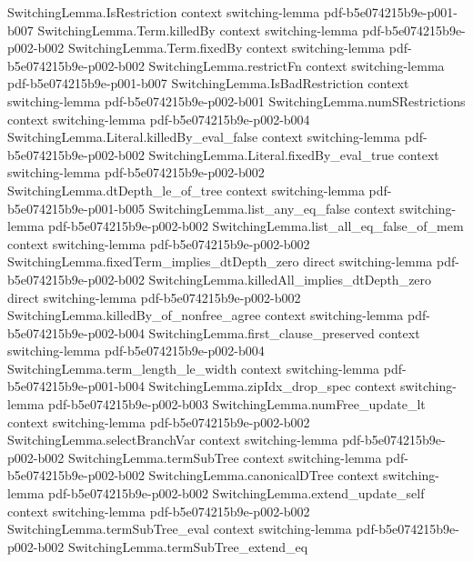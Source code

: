 \begin{lemma}
\proofstep
  {SwitchingLemma.IsRestriction}
  {context}
  {switching-lemma}
  {pdf-b5e074215b9e-p001-b007}
\proofstep
  {SwitchingLemma.Term.killedBy}
  {context}
  {switching-lemma}
  {pdf-b5e074215b9e-p002-b002}
\proofstep
  {SwitchingLemma.Term.fixedBy}
  {context}
  {switching-lemma}
  {pdf-b5e074215b9e-p002-b002}
\proofstep
  {SwitchingLemma.restrictFn}
  {context}
  {switching-lemma}
  {pdf-b5e074215b9e-p001-b007}
\proofstep
  {SwitchingLemma.IsBadRestriction}
  {context}
  {switching-lemma}
  {pdf-b5e074215b9e-p002-b001}
\proofstep
  {SwitchingLemma.numSRestrictions}
  {context}
  {switching-lemma}
  {pdf-b5e074215b9e-p002-b004}
\proofstep
  {SwitchingLemma.Literal.killedBy_eval_false}
  {context}
  {switching-lemma}
  {pdf-b5e074215b9e-p002-b002}
\proofstep
  {SwitchingLemma.Literal.fixedBy_eval_true}
  {context}
  {switching-lemma}
  {pdf-b5e074215b9e-p002-b002}
\proofstep
  {SwitchingLemma.dtDepth_le_of_tree}
  {context}
  {switching-lemma}
  {pdf-b5e074215b9e-p001-b005}
\proofstep
  {SwitchingLemma.list_any_eq_false}
  {context}
  {switching-lemma}
  {pdf-b5e074215b9e-p002-b002}
\proofstep
  {SwitchingLemma.list_all_eq_false_of_mem}
  {context}
  {switching-lemma}
  {pdf-b5e074215b9e-p002-b002}
\proofstep
  {SwitchingLemma.fixedTerm_implies_dtDepth_zero}
  {direct}
  {switching-lemma}
  {pdf-b5e074215b9e-p002-b002}
\proofstep
  {SwitchingLemma.killedAll_implies_dtDepth_zero}
  {direct}
  {switching-lemma}
  {pdf-b5e074215b9e-p002-b002}
\proofstep
  {SwitchingLemma.killedBy_of_nonfree_agree}
  {context}
  {switching-lemma}
  {pdf-b5e074215b9e-p002-b004}
\proofstep
  {SwitchingLemma.first_clause_preserved}
  {context}
  {switching-lemma}
  {pdf-b5e074215b9e-p002-b004}
\proofstep
  {SwitchingLemma.term_length_le_width}
  {context}
  {switching-lemma}
  {pdf-b5e074215b9e-p001-b004}
\proofstep
  {SwitchingLemma.zipIdx_drop_spec}
  {context}
  {switching-lemma}
  {pdf-b5e074215b9e-p002-b003}
\proofstep
  {SwitchingLemma.numFree_update_lt}
  {context}
  {switching-lemma}
  {pdf-b5e074215b9e-p002-b002}
\proofstep
  {SwitchingLemma.selectBranchVar}
  {context}
  {switching-lemma}
  {pdf-b5e074215b9e-p002-b002}
\proofstep
  {SwitchingLemma.termSubTree}
  {context}
  {switching-lemma}
  {pdf-b5e074215b9e-p002-b002}
\proofstep
  {SwitchingLemma.canonicalDTree}
  {context}
  {switching-lemma}
  {pdf-b5e074215b9e-p002-b002}
\proofstep
  {SwitchingLemma.extend_update_self}
  {context}
  {switching-lemma}
  {pdf-b5e074215b9e-p002-b002}
\proofstep
  {SwitchingLemma.termSubTree_eval}
  {context}
  {switching-lemma}
  {pdf-b5e074215b9e-p002-b002}
\proofstep
  {SwitchingLemma.termSubTree_extend_eq}

\end{lemma}
